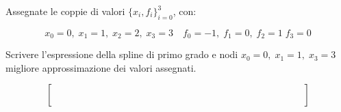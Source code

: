 Assegnate le coppie di valori $\{x_i,f_i \}_{i=0}^3$, con:

\[ x_0=0, \; x_1=1, \; x_2=2, \; x_3=3 \quad f_0=-1, \; f_1=0, \; f_2=1 \; f_3=0 \]

\noindent Scrivere l'espressione della spline di primo grado e 
nodi $x_0=0, \; x_1=1,\; x_3=3$  migliore approssimazione dei 
valori assegnati.

\[
\left [
\begin{array}{cccccccccccccc}
 \quad &  \quad & \quad &  \quad &  \quad &  \quad &  \quad  \quad & \quad &  \quad & \quad &  \quad & \quad & \quad &  \quad  \\
 \quad & \quad & \quad &  \quad &  \quad &  \quad &  \quad  \quad & \quad &  \quad & \quad &  \quad & \quad & \quad &  \quad \\
 \quad & \quad & \quad &  \quad &  \quad &  \quad &  \quad  \quad & \quad &  \quad & \quad &  \quad & \quad & \quad &  \quad\\
   \quad &  \quad & \quad &  \quad &  \quad &  \quad &  \quad  \quad & \quad &  \quad & \quad &  \quad & \quad & \quad &  \quad  \\
  \quad &  \quad & \quad &  \quad &  \quad &  \quad &  \quad  \quad & \quad &  \quad & \quad &  \quad & \quad & \quad &  \quad  
\end{array}\right]
\]
